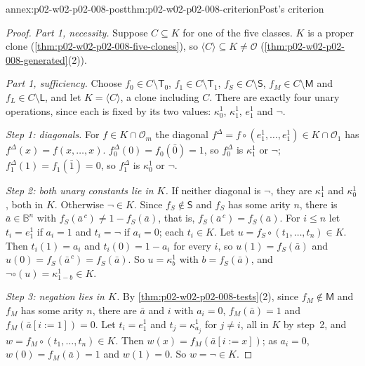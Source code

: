 \begin{annexitem}{annex:p02-w02-p02-008-post}{thm:p02-w02-p02-008-criterion}{Post's criterion}
\begin{proof}
\emph{Part 1, necessity.}  Suppose \(C\subseteq K\) for one of the five
classes.  \(K\) is a proper clone (\cref{thm:p02-w02-p02-008-five-clones}),
so \(\langle C\rangle\subseteq K\neq\mathcal O\)
(\cref{thm:p02-w02-p02-008-generated}(2)).

\emph{Part 1, sufficiency.}  Choose \(f_0\in C\setminus\mathsf T_0\),
\(f_1\in C\setminus\mathsf T_1\), \(f_S\in C\setminus\mathsf S\),
\(f_M\in C\setminus\mathsf M\) and \(f_L\in C\setminus\mathsf L\), and let
\(K=\langle C\rangle\), a clone including \(C\).  There are exactly four
unary operations, since each is fixed by its two values: \(\kappa^1_0\),
\(\kappa^1_1\), \(e^1_1\) and \(\neg\).

\emph{Step 1: diagonals.}  For \(f\in K\cap\mathcal O_m\) the diagonal
\(f^\Delta=f\circ(e^1_1,\ldots,e^1_1)\in K\cap\mathcal O_1\) has
\(f^\Delta(x)=f(x,\ldots,x)\).  \(f_0^\Delta(0)=f_0(\bar0)=1\), so
\(f_0^\Delta\) is \(\kappa^1_1\) or \(\neg\); \(f_1^\Delta(1)=f_1(\bar1)=0\),
so \(f_1^\Delta\) is \(\kappa^1_0\) or \(\neg\).

\emph{Step 2: both unary constants lie in \(K\).}  If neither diagonal is
\(\neg\), they are \(\kappa^1_1\) and \(\kappa^1_0\), both in \(K\).
Otherwise \(\neg\in K\).  Since \(f_S\notin\mathsf S\) and \(f_S\) has some
arity \(n\), there is \(\bar a\in\mathbb B^n\) with
\(f_S(\bar a^{\,c})\neq1-f_S(\bar a)\), that is,
\(f_S(\bar a^{\,c})=f_S(\bar a)\).  For \(i\leq n\) let \(t_i=e^1_1\) if
\(a_i=1\) and \(t_i=\neg\) if \(a_i=0\); each \(t_i\in K\).  Let
\(u=f_S\circ(t_1,\ldots,t_n)\in K\).  Then \(t_i(1)=a_i\) and
\(t_i(0)=1-a_i\) for every \(i\), so \(u(1)=f_S(\bar a)\) and
\(u(0)=f_S(\bar a^{\,c})=f_S(\bar a)\).  So \(u=\kappa^1_b\) with
\(b=f_S(\bar a)\), and \(\neg\circ(u)=\kappa^1_{1-b}\in K\).

\emph{Step 3: negation lies in \(K\).}  By
\cref{thm:p02-w02-p02-008-tests}(2), since \(f_M\notin\mathsf M\) and
\(f_M\) has some arity \(n\), there are \(\bar a\) and \(i\) with
\(a_i=0\), \(f_M(\bar a)=1\) and \(f_M(\bar a[i{:=}1])=0\).  Let
\(t_i=e^1_1\) and \(t_j=\kappa^1_{a_j}\) for \(j\neq i\), all in \(K\) by
step~2, and \(w=f_M\circ(t_1,\ldots,t_n)\in K\).  Then
\(w(x)=f_M(\bar a[i{:=}x])\); as \(a_i=0\), \(w(0)=f_M(\bar a)=1\) and
\(w(1)=0\).  So \(w=\neg\in K\).


\end{proof}
\end{annexitem}
